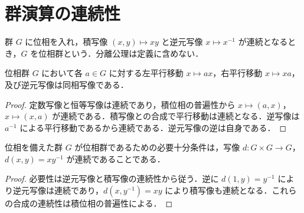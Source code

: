 \section{群演算の連続性}
\begin{defn}[位相群]
群 $G$ に位相を入れ，積写像 $(x,y)\mapsto xy$ と逆元写像 $x\mapsto x^{-1}$ が連続となるとき，$G$ を位相群という．分離公理は定義に含めない．
\end{defn}
\begin{prop}[平行移動と逆元の同相性]
位相群 $G$ において各 $a\in G$ に対する左平行移動 $x\mapsto ax$，右平行移動 $x\mapsto xa$，及び逆元写像は同相写像である．
\end{prop}
\begin{proof}
定数写像と恒等写像は連続であり，積位相の普遍性から $x\mapsto(a,x)$，$x\mapsto(x,a)$ が連続である．積写像との合成で平行移動は連続となる．逆写像は $a^{-1}$ による平行移動であるから連続である．逆元写像の逆は自身である．
\end{proof}
\begin{prop}[差写像による位相群の判定]
位相を備えた群 $G$ が位相群であるための必要十分条件は，写像 $d:G\times G\to G$，$d(x,y)=xy^{-1}$ が連続であることである．
\end{prop}
\begin{proof}
必要性は逆元写像と積写像の連続性から従う．逆に $d(1,y)=y^{-1}$ により逆元写像は連続であり，$d(x,y^{-1})=xy$ により積写像も連続となる．これらの合成の連続性は積位相の普遍性による．
\end{proof}
